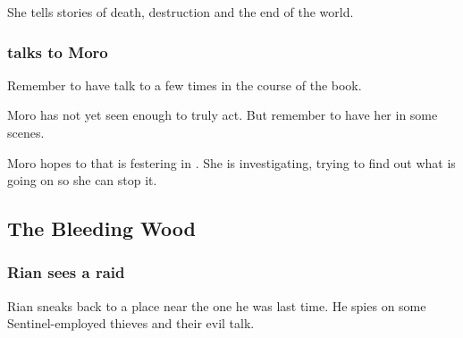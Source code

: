 She tells stories of death, destruction and the end of the world.






\subsubsection{\Tiroco{} talks to Moro}
Remember to have \Tiroco{} talk to \MoroCobrel{} a few times in the course of the book.

Moro has not yet seen enough to truly act. But remember to have her in some scenes. 

Moro hopes to  that is festering in \Malcur. 
She is investigating, trying to find out what is going on so she can stop it. 








\subsection{The Bleeding Wood}





\subsubsection{Rian sees a raid}
Rian sneaks back to a place near the one he was last time. 
He spies on some Sentinel-employed thieves and their evil talk. 

